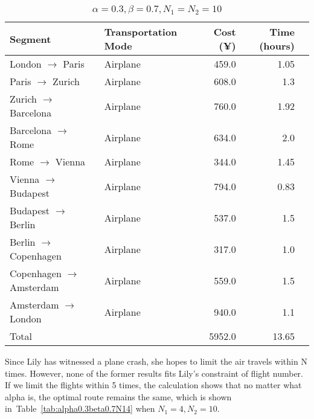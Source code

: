 \documentclass{article} %
\begin{document}
\begin{table}[!ht]
  \centering
  \begin{tabular}{llrrr}
    \toprule
    Segment                          & Transportation Mode & Cost (¥) & Time (hours) \\
    \midrule
    London $\rightarrow$  Paris      & Airplane            & 459.0    & 1.05         \\
    Paris $\rightarrow$  Zurich      & Airplane            & 608.0    & 1.3          \\
    Zurich $\rightarrow$  Barcelona  & Airplane            & 760.0    & 1.92         \\
    Barcelona $\rightarrow$  Rome    & Airplane            & 634.0    & 2.0          \\
    Rome $\rightarrow$  Vienna       & Airplane            & 344.0    & 1.45         \\
    Vienna $\rightarrow$  Budapest   & Airplane            & 794.0    & 0.83         \\
    Budapest $\rightarrow$  Berlin   & Airplane            & 537.0    & 1.5          \\
    Berlin $\rightarrow$  Copenhagen & Airplane            & 317.0    & 1.0          \\
    Copenhagen $\rightarrow$  Amsterdam & Airplane          & 559.0    & 1.5          \\
    Amsterdam $\rightarrow$  London  & Airplane            & 940.0    & 1.1          \\
    \midrule
    Total                            &                     & 5952.0   & 13.65        \\
    \bottomrule
  \end{tabular}
  \caption{$\alpha=0.3, \beta=0.7, N_1=N_2=10$}%
  \label{tab:alpha0.3beta0.7}
\end{table}

Since Lily has witnessed a plane crash, she hopes to limit the air travels within N times. However, none of the former results fits Lily's constraint of flight number. If we limit the flights within 5 times, the calculation shows that no matter what alpha is, the optimal route remains the same, which is shown in~Table~\ref{tab:alpha0.3beta0.7N14} when $N_1=4, N_2=10$. 
\end{document}
